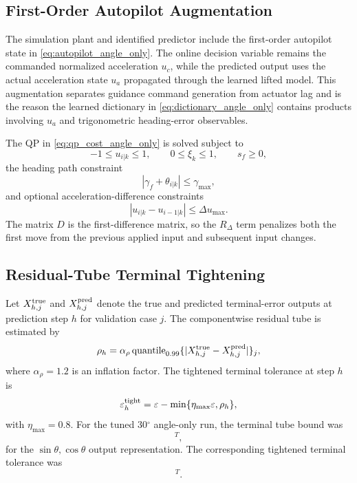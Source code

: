 \documentclass[letterpaper,journal]{IEEEtran}
\begin{document}
\subsection{First-Order Autopilot Augmentation}
The simulation plant and identified predictor include the first-order autopilot state in \eqref{eq:autopilot_angle_only}. The online decision variable remains the commanded normalized acceleration $u_c$, while the predicted output uses the actual acceleration state $u_a$ propagated through the learned lifted model. This augmentation separates guidance command generation from actuator lag and is the reason the learned dictionary in \eqref{eq:dictionary_angle_only} contains products involving $u_a$ and trigonometric heading-error observables.

The QP in \eqref{eq:qp_cost_angle_only} is solved subject to
\begin{equation}
    -1\le u_{i|k}\le 1,\qquad 0\le \xi_k\le 1,\qquad s_f\ge0,
\end{equation}
the heading path constraint
\begin{equation}
    |\gamma_f+\theta_{i|k}|\le \gamma_{\max},
\end{equation}
and optional acceleration-difference constraints
\begin{equation}
    |u_{i|k}-u_{i-1|k}|\le \Delta u_{\max}.
\end{equation}
The matrix $D$ is the first-difference matrix, so the $R_\Delta$ term penalizes both the first move from the previous applied input and subsequent input changes.

\subsection{Residual-Tube Terminal Tightening}
Let $X_{h,j}^{\rm true}$ and $X_{h,j}^{\rm pred}$ denote the true and predicted terminal-error outputs at prediction step $h$ for validation case $j$. The componentwise residual tube is estimated by
\begin{equation}
    \rho_h=\alpha_\rho\operatorname{quantile}_{0.99}
    \{|X_{h,j}^{\rm true}-X_{h,j}^{\rm pred}|\}_j ,
    \label{eq:tube_bound_angle_only}
\end{equation}
where $\alpha_\rho=1.2$ is an inflation factor. The tightened terminal tolerance at step $h$ is
\begin{equation}
    \varepsilon_h^{\rm tight}=
    \varepsilon-\min\{\eta_{\max}\varepsilon,\rho_h\},
    \label{eq:tightening_angle_only}
\end{equation}
with $\eta_{\max}=0.8$. For the tuned 30$^\circ$ angle-only run, the terminal tube bound was
\begin{equation}
    [9.731{\times}10^{-5},\;9.991{\times}10^{-5},\;
    1.242{\times}10^{-3},\;1.182{\times}10^{-3}]^T ,
\end{equation}
for the $\sin\theta,\cos\theta$ output representation. The corresponding tightened terminal tolerance was
\begin{equation}
    [4.027{\times}10^{-4},\;4.001{\times}10^{-4},\;
    5.109{\times}10^{-2},\;2.741{\times}10^{-4}]^T .
\end{equation}
\end{document}
